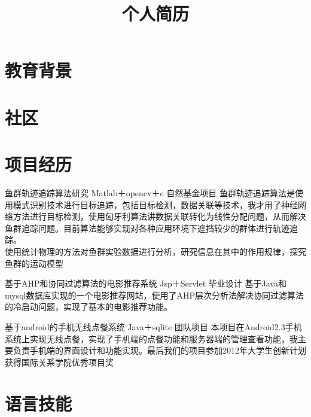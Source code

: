 \documentclass[11pt,a4paper]{moderncv}
\title{个人简历}                      %
\begin{document}
\maketitle

\section{教育背景}


\section{社区}

\section{项目经历}
\renewcommand{\baselinestretch}{1.2}

{鱼群轨迹追踪算法研究}
{Matlab＋opencv＋c}
{自然基金项目}{}
{鱼群轨迹追踪算法是使用模式识别技术进行目标追踪，包括目标检测，数据关联等技术，我才用了神经网络方法进行目标检测，使用匈牙利算法讲数据关联转化为线性分配问题，从而解决鱼群追踪问题。目前算法能够实现对各种应用环境下遮挡较少的群体进行轨迹追踪。
\\使用统计物理的方法对鱼群实验数据进行分析，研究信息在其中的作用规律，探究鱼群的运动模型
}

{基于AHP和协同过滤算法的电影推荐系统}
{Jsp＋Servlet}
{毕业设计}{}
{基于Java和mysql数据库实现的一个电影推荐网站，使用了AHP层次分析法解决协同过滤算法的冷启动问题，实现了基本的电影推荐功能。}

{基于android的手机无线点餐系统}
{Java＋sqlite}
{团队项目}{}
{本项目在Android2.3手机系统上实现无线点餐，实现了手机端的点餐功能和服务器端的管理查看功能，我主要负责手机端的界面设计和功能实现。最后我们的项目参加2012年大学生创新计划获得国际关系学院优秀项目奖}

\section{语言技能}
\end{document}
